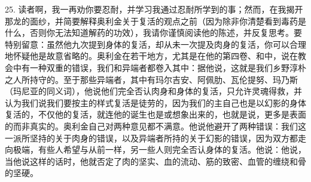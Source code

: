 25. 读者啊，我一再劝你要忍耐，并学习我通过忍耐所学到的事；然而，在我揭开那龙的面纱，并简要解释奥利金关于复活的观点之前（因为除非你清楚看到毒药是什么，否则你无法知道解药的功效），我请你谨慎阅读他的陈述，并反复思考。要特别留意：虽然他九次提到身体的复活，却从未一次提及肉身的复活，你可以合理地怀疑他是故意省略的。奥利金在若干地方，尤其是在他的第四卷、和中，说在教会中有一种双重的错误，我们和异端者都卷入其中：据他说，这就是我们乡野淳朴之人所持守的。至于那些异端者，其中有玛尔吉安、阿佩肋、瓦伦提努、玛乃斯（玛尼亚的同义词），他说他们完全否认肉身和身体的复活，只允许灵魂得救，并认为我们说我们要按主的样式复活是徒劳的，因为我们的主自己也是以幻影的身体复活的，不仅他的复活，就连他的诞生也是或想象出来的，也就是说，更多是表面的而非真实的。奥利金自己对两种意见都不满意。他说他避开了两种错误：我们这一派所坚持的关于肉身的错误，以及异端者所持的关于幻影的错误，因为双方都走向极端，有些人希望与从前一样，另一些人则完全否认身体的复活。他说：他说，当他说这样的话时，他就否定了肉的坚实、血的流动、筋的致密、血管的缠绕和骨的坚硬。\par


